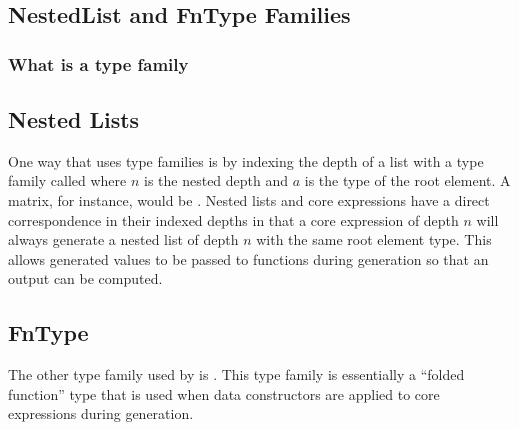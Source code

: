 \subsection{NestedList and FnType Families}
\subsubsection{What is a type family}

\subsection{Nested Lists}
\par One way that \ourDSL uses type families is by indexing the depth of a list with a type family called  
where $n$ is the nested depth and $a$ is the type of the root element. 
A matrix, for instance, would be .
Nested lists and core expressions have a direct correspondence in their indexed depths in that a core expression of depth $n$ will always generate
a nested list of depth $n$ with the same root element type.
This allows generated values to be passed to functions during generation so that an output can be computed.

\subsection{FnType}
\par The other type family used by \ourDSL is . 
This type family is essentially a ``folded function'' type that is used when data constructors are applied to core expressions during generation.
